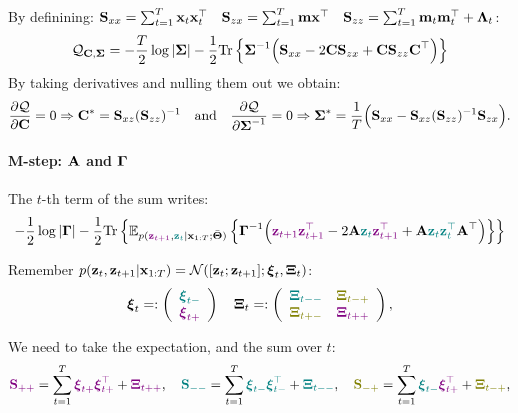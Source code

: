  By definining: $\boldsymbol{\mathbf{S}}_{xx} = \sum_{t=1}^T \boldsymbol{\mathbf{x}}_t\boldsymbol{\mathbf{x}}_t^\top \quad \boldsymbol{\mathbf{S}}_{zx} = \sum_{t=1}^T \boldsymbol{\mathbf{m}}\boldsymbol{\mathbf{x}}^\top \quad \boldsymbol{\mathbf{S}}_{zz} = \sum_{t=1}^T \boldsymbol{\mathbf{m}}_t\boldsymbol{\mathbf{m}}_t^\top + \boldsymbol{\mathbf{\Lambda}}_{t}$:
  \begin{align}
  \mathcal{Q}_{\boldsymbol{\mathbf{C}},\boldsymbol{\mathbf{\Sigma}}} = -\frac{T}{2}\log|\boldsymbol{\mathbf{\Sigma}}| -\frac{1}{2}\textrm{Tr}\left\{\boldsymbol{\mathbf{\Sigma}}^{-1}\Big( \boldsymbol{\mathbf{S}}_{xx} - 2\boldsymbol{\mathbf{C}}\boldsymbol{\mathbf{S}}_{zx} +\boldsymbol{\mathbf{C}}\boldsymbol{\mathbf{S}}_{zz}\boldsymbol{\mathbf{C}}^\top  \Big)\right\}
 \end{align}
By taking derivatives and nulling them out we obtain:
 \begin{equation}
  \frac{\partial \mathcal{Q}}{\partial \boldsymbol{\mathbf{C}}}=0 \Rightarrow \boldsymbol{\mathbf{C}}^* = \boldsymbol{\mathbf{S}}_{xz}( \boldsymbol{\mathbf{S}}_{zz})^{-1}
\quad\text{and}\quad
 \frac{\partial \mathcal{Q}}{\partial \boldsymbol{\mathbf{\Sigma}}^{-1}}=0 \Rightarrow \boldsymbol{\mathbf{\Sigma}}^* = \frac{1}{T}\Big(\boldsymbol{\mathbf{S}}_{xx} - \boldsymbol{\mathbf{S}}_{xz}( \boldsymbol{\mathbf{S}}_{zz})^{-1}\boldsymbol{\mathbf{S}}_{zx}\Big).
\end{equation}


\paragraph{M-step: $\boldsymbol{\mathbf{A}}$ and $\boldsymbol{\mathbf{\Gamma}}$} The $t$-th term of the sum writes: 
\begin{align}
 -\frac{1}{2}\log|\bs{\Gamma}| -\frac{1}{2} \textrm{Tr}\left\{\mathbb{E}_{p(\paint{myfuture}{\bs{z}_{t+1}},\paint{mypresent}{\bs{z}_t}|\bs{x}_{1:T};\bar{\bs{\Theta}})}\left\{\bs{\Gamma}^{-1}\Big( \paint{myfuture}{\bs{z}_{t+1}\bs{z}_{t+1}^\top} - 2\bs{A}\paint{mypresent}{\bs{z}_{t}}\paint{myfuture}{\bs{z}_{t+1}^\top} +\bs{A}\paint{mypresent}{\bs{z}_{t}\bs{z}_{t}^\top}\bs{A}^\top  \Big)\right\}\right\}
 \end{align}

Remember $p(\boldsymbol{\mathbf{z}}_t,\boldsymbol{\mathbf{z}}_{t+1}|\boldsymbol{\mathbf{x}}_{1:T}) = {\cal N}([\boldsymbol{\mathbf{z}}_{t};\boldsymbol{\mathbf{z}}_{t+1}]; \boldsymbol{\mathbf{\xi}}_t,\boldsymbol{\mathbf{\Xi}}_t)$:
\begin{equation}
 \bs{\xi}_t =: \myarray{c}{\paint{mypresent}{\bs{\xi}_{t-}}\\\paint{myfuture}{\bs{\xi}_{t+}}} \quad \bs{\Xi}_t =: \myarray{cc}{ \paint{mypresent}{\bs{\Xi}_{t--}} & \paint{mymix}{\bs{\Xi}_{t-+}} \\ \paint{mymix}{\bs{\Xi}_{t+-}} & \paint{myfuture}{\bs{\Xi}_{t++}}},
\end{equation}

We need to take the expectation, and the sum over $t$:
\begin{equation}
 \paint{myfuture}{\bs{S}_{++}} = \sum_{t=1}^T \paint{myfuture}{\bs{\xi}_{t+}}\paint{myfuture}{\bs{\xi}_{t+}^\top} + \paint{myfuture}{\bs{\Xi}_{t++}}, \quad 
 \paint{mypresent}{\bs{S}_{--}} = \sum_{t=1}^T \paint{mypresent}{\bs{\xi}_{t-}}\paint{mypresent}{\bs{\xi}_{t-}^\top} + \paint{mypresent}{\bs{\Xi}_{t--}}, \quad
 \paint{mymix}{\bs{S}_{-+}} = \sum_{t=1}^T \paint{mypresent}{\bs{\xi}_{t-}}\paint{myfuture}{\bs{\xi}_{t+}^\top} + \paint{mymix}{\bs{\Xi}_{t-+}},
 \end{equation}

